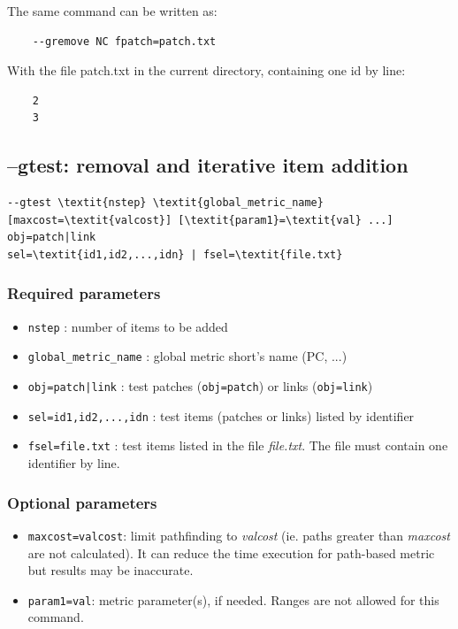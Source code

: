 \documentclass[a4paper,10pt]{report}
\begin{document}
The same command can be written as:
\begin{Verbatim}
	--gremove NC fpatch=patch.txt
\end{Verbatim}
With the file patch.txt in the current directory, containing one id by line:
\begin{Verbatim}
	2
	3
\end{Verbatim}


\subsection{--gtest: removal and iterative item addition}
\begin{Verbatim}[commandchars=\\\{\}]
--gtest \textit{nstep} \textit{global_metric_name} [maxcost=\textit{valcost}] [\textit{param1}=\textit{val} ...] obj=patch|link
sel=\textit{id1,id2,...,idn} | fsel=\textit{file.txt}
\end{Verbatim}

\subsubsection{Required parameters}
\begin{itemize}
	\item \verb|nstep| : number of items to be added
	\item \verb|global_metric_name| : global metric short's name (PC, ...)
	\item \verb+obj=patch|link+ : test patches (\verb+obj=patch+) or links (\verb+obj=link+)
	\item \verb|sel=id1,id2,...,idn| : test items (patches or links) listed by identifier
	\item \verb|fsel=file.txt| : test items listed in the file \textit{file.txt}. The file must contain one identifier by line.
\end{itemize}

\subsubsection{Optional parameters}
\begin{itemize}
	\item \verb|maxcost=valcost|: limit pathfinding to \textit{valcost} (ie. paths greater than \textit{maxcost} are not calculated). It can reduce the time execution for path-based metric but results may be inaccurate.
	\item \verb|param1=val|: metric parameter(s), if needed. Ranges are not allowed for this command.
\end{itemize}
\end{document}
